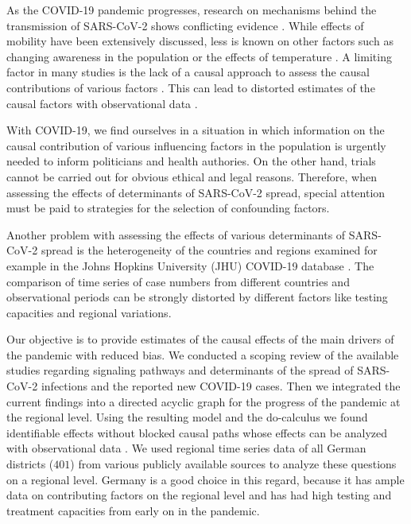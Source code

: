 \documentclass[]{elsarticle} %
\begin{document}
As the COVID-19 pandemic progresses, research on mechanisms behind the transmission of SARS-CoV-2 shows conflicting evidence \citep{who2020report, Chinazzi395, guan2020clinical}. While effects of mobility have been extensively discussed, less is known on other factors such as changing awareness in the population \citep{higgins_correlations_2020, li_retrospective_2020, yuan_trends_2020} or the effects of temperature \citep{bannister-tyrrell_preliminary_2020, demongeot_temperature_2020, liu_impact_2020}. A limiting factor in many studies is the lack of a causal approach to assess the causal contributions of various factors \citep{Greenland1999}. This can lead to distorted estimates of the causal factors with observational data \citep{Greenland1999, schipf_directed_2011, textor_robust_2017}.

With COVID-19, we find ourselves in a situation in which information on the causal contribution of various influencing factors in the population is urgently needed to inform politicians and health authories. On the other hand, trials cannot be carried out for obvious ethical and legal reasons. Therefore, when assessing the effects of determinants of SARS-CoV-2 spread, special attention must be paid to strategies for the selection of confounding factors.

Another problem with assessing the effects of various determinants of SARS-CoV-2 spread is the heterogeneity of the countries and regions examined for example in the Johns Hopkins University (JHU) COVID-19 database \citep{jhucovid19db2020}. The comparison of time series of case numbers from different countries and observational periods can be strongly distorted by different factors like testing capacities and regional variations.

Our objective is to provide estimates of the causal effects of the main drivers of the pandemic with reduced bias. We conducted a scoping review of the available studies regarding signaling pathways and determinants of the spread of SARS-CoV-2 infections and the reported new COVID-19 cases. Then we integrated the current findings into a directed acyclic graph for the progress of the pandemic at the regional level. Using the resulting model and the do-calculus we found identifiable effects without blocked causal paths whose effects can be analyzed with observational data \citep{Pearl_2014}. We used regional time series data of all German districts (\(401\)) from various publicly available sources to analyze these questions on a regional level. Germany is a good choice in this regard, because it has ample data on contributing factors on the regional level and has had high testing and treatment capacities from early on in the pandemic.
\end{document}
